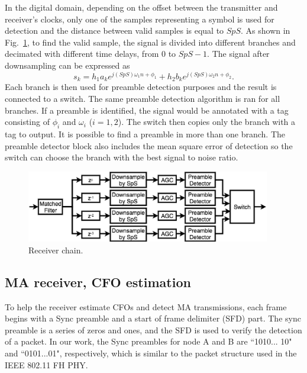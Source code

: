 In the digital domain, depending on the offset between the transmitter and receiver's clocks, only one of the samples representing a symbol is used for detection and the distance between valid samples is equal to $SpS$. As shown in Fig.~\ref{fig:pncreceiver}, to find the valid sample, the signal is divided into different branches and decimated with different time delays, from $0$ to $ SpS -1$. The signal after downsampling can be expressed as
\begin{equation}
    s_k=h_1 a_k e^{j (SpS) \omega_1 n + \phi_1} + h_2 b_k e^{j (SpS) \omega_2 n + \phi_2}.
\end{equation}
Each branch is then used for preamble detection purposes and the result is connected to a switch. The same preamble detection algorithm is ran for all branches. If a preamble is identified, the signal would be annotated with a tag consisting of $\phi_i$ and $\omega_i$ ($i=1,2$). The switch then copies only the branch with a tag to output. It is possible to find a preamble in more than one branch. The preamble detector block  also includes the mean square error of detection so the switch can choose the branch with the best signal to noise ratio. %



\begin{figure}
    \centering
    \includegraphics[width=0.95\textwidth]{figures/pncreceiver.eps}
    \caption{Receiver chain.} \label{fig:pncreceiver}
\end{figure}


\subsection{MA receiver, CFO estimation}
To help the receiver estimate CFOs and detect MA transmissions, each frame begins with a Sync preamble and a start of frame delimiter (SFD) part. The sync preamble is a series of zeros and ones, and the SFD is used to verify the detection of a packet.  
In our work, the Sync preambles for node A and B are ``1010... 10" and ``0101...01", respectively, which is similar to the packet structure used in the IEEE 802.11 FH PHY.

